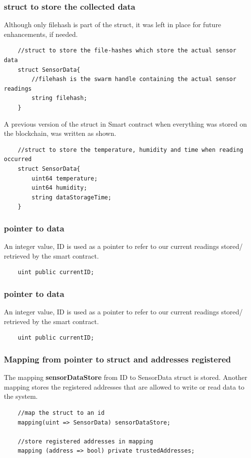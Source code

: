 \documentclass[11pt,openright]{report}
\begin{document}
\subsubsection{struct to store the collected data}
Although only filehash is part of the struct, it was left in place for future enhancements, if needed.
\begin{verbatim}
    //struct to store the file-hashes which store the actual sensor data
    struct SensorData{
        //filehash is the swarm handle containing the actual sensor readings
        string filehash;
    }
\end{verbatim}

A previous version of the struct in Smart contract when everything was stored on the blockchain, was written as shown.

\begin{verbatim}
    //struct to store the temperature, humidity and time when reading occurred
    struct SensorData{
        uint64 temperature;
        uint64 humidity;
        string dataStorageTime;
    }
\end{verbatim}

\subsubsection{pointer to data}
An integer value, ID is used as a pointer to refer to our current readings stored/ retrieved by the smart contract.
\begin{verbatim}
    uint public currentID;
\end{verbatim}

\subsubsection{pointer to data}
An integer value, ID is used as a pointer to refer to our current readings stored/ retrieved by the smart contract.
\begin{verbatim}
    uint public currentID;
\end{verbatim}

\subsubsection{Mapping from pointer to struct and addresses registered}
The mapping \textbf{sensorDataStore} from ID to SensorData struct is stored. Another mapping stores the registered addresses that are allowed to write or read data to the system.
\begin{verbatim}
    //map the struct to an id
    mapping(uint => SensorData) sensorDataStore;

    //store registered addresses in mapping
    mapping (address => bool) private trustedAddresses;
\end{verbatim}
\end{document}
